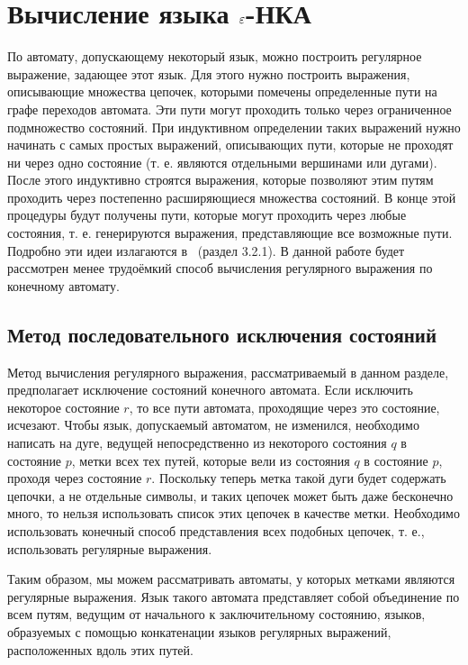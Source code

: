 

\section{Вычисление языка $\varepsilon$-НКА}
\label{Chapter4FALang}
По автомату, допускающему некоторый язык, можно построить регулярное выражение, задающее этот язык. Для этого нужно построить выражения, описывающие множества цепочек, которыми помечены определенные пути на графе переходов автомата. Эти пути могут проходить только через ограниченное подмножество состояний. При индуктивном определении таких выражений нужно начинать с самых простых выражений, описывающих пути, которые не проходят ни через одно состояние (т. е. являются отдельными вершинами или дугами). После этого индуктивно строятся выражения, которые позволяют этим путям проходить через постепенно расширяющиеся множества состояний. В конце этой процедуры будут получены пути, которые могут проходить через любые состояния, т. е. генерируются выражения, представляющие все возможные пути. Подробно эти идеи излагаются в~\cite{Hop} (раздел 3.2.1).
В данной работе будет рассмотрен менее трудоёмкий способ вычисления регулярного выражения по конечному автомату.
\subsection*{Метод последовательного исключения состояний}
Метод вычисления регулярного выражения, рассматриваемый в данном разделе, предполагает исключение состояний конечного автомата. Если исключить некоторое состояние $r$, то все пути автомата, проходящие через это состояние, исчезают. Чтобы язык, допускаемый автоматом, не изменился, необходимо написать на дуге, ведущей непосредственно из некоторого состояния $q$ в состояние $p$, метки всех тех путей, которые вели из состояния $q$ в состояние $p$, проходя через состояние $r$. Поскольку теперь метка такой дуги будет содержать цепочки, а не отдельные символы, и таких цепочек может быть даже бесконечно много, то нельзя использовать список этих цепочек в качестве метки. Необходимо использовать конечный способ представления всех подобных цепочек, т. е., использовать регулярные выражения.

Таким образом, мы можем рассматривать автоматы, у которых метками являются регулярные выражения. Язык такого автомата представляет собой объединение по всем путям, ведущим от начального к заключительному состоянию, языков, образуемых с помощью конкатенации языков регулярных выражений, расположенных вдоль этих путей.

